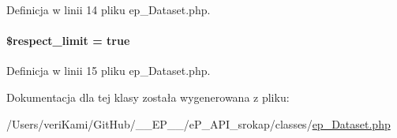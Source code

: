 Definicja w linii 14 pliku ep\-\_\-\-Dataset.\-php.

\hypertarget{classep___dataset_af679319b32be717b99242a2d66f04d71}{
\paragraph[{\$respect\-\_\-limit}]{\setlength{\rightskip}{0pt plus 5cm}\$respect\-\_\-limit = true}}\label{classep___dataset_af679319b32be717b99242a2d66f04d71}


Definicja w linii 15 pliku ep\-\_\-\-Dataset.\-php.



Dokumentacja dla tej klasy została wygenerowana z pliku\-:\begin{DoxyCompactItemize}
\item 
/\-Users/veri\-Kami/\-Git\-Hub/\-\_\-\-\_\-\-E\-P\-\_\-\-\_\-/e\-P\-\_\-\-A\-P\-I\-\_\-srokap/classes/\hyperlink{ep___dataset_8php}{ep\-\_\-\-Dataset.\-php}\end{DoxyCompactItemize}
